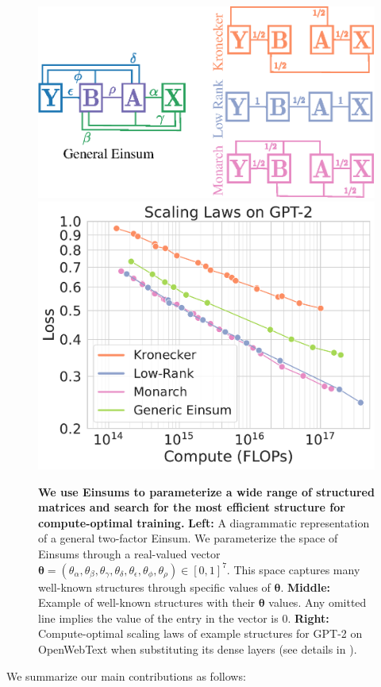\documentclass{article}
\newcommand{\mbf}[1]{{\boldsymbol{\mathbf{#1}}}}
\newcommand{\bm}{\mbf}
\begin{document}
\begin{figure}[!t]
\centering
    \includegraphics[width=0.5\linewidth]{figs/cases.eps}
    \includegraphics[width=0.37\linewidth]{figs/exmaple_scaling.pdf}
   \caption{
   \textbf{We use Einsums to parameterize a wide range of structured matrices and search for the most efficient structure for compute-optimal training.}
   \textbf{Left:} A diagrammatic representation of a general two-factor Einsum.
   We parameterize the space of Einsums through a real-valued vector
   $\bm{\theta}=(\theta_\alpha,\theta_\beta,\theta_\gamma,\theta_\delta,\theta_\epsilon,\theta_\phi,\theta_\rho) \in [0,1]^{7}$.
   This space captures many well-known structures through specific values of $\bm{\theta}$.
   \textbf{Middle:} Example of well-known structures with their $\bm{\theta}$ values. Any omitted line implies the value of the entry in the vector is 0.
   \textbf{Right:} Compute-optimal scaling laws of example structures for GPT-2 on OpenWebText when substituting its dense layers (see details in ).
   }
    \label{fig:goal}
    \vspace{-5mm}
\end{figure}
We summarize our main contributions as follows:
\end{document}
